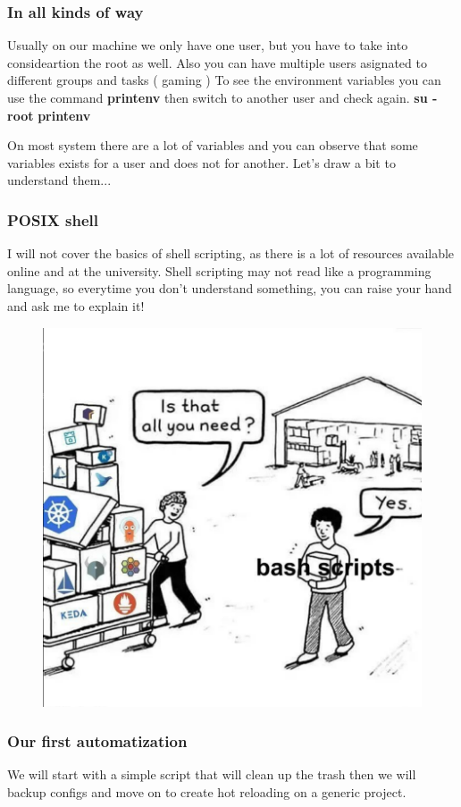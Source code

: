 \documentclass{beamer}
\begin{document}
\begin{frame}
    \frametitle{In all kinds of way}
    \small Usually on our machine we only have one user, but you have to
    take into consideartion the root as well. Also you can have multiple users
    asignated to different groups and tasks ( gaming )
    \newline
    \newline
    To see the environment variables you can use the command\newline
    \textbf{printenv} \newline
    then switch to another user and check again.\newline
    \textbf{su - root} \newline
    \textbf{printenv} \newline

    On most system there are a lot of variables and you can observe that
    some variables exists for a user and does not for another. \newline
    \newline
    Let's draw a bit to understand them...
\end{frame}


\begin{frame}
\frametitle{POSIX shell}
\small
I will not cover the basics of shell scripting, as there is a lot of resources available online and at the university.
    \newline \newline
Shell scripting may not read like a programming language, so everytime you
don't understand something, you can raise your hand and ask me to explain it!
    \begin{figure}
        \includegraphics[width=0.4\linewidth] {bashgod}
        \label{fig:bashgod}
    \end{figure}

\end{frame}

\begin{frame}
    \frametitle{Our first automatization}
    \small We will start with a simple script that will clean up the trash
    \newline then we will backup configs and move on to create hot reloading
    on a generic project.
\end{frame}
\end{document}
